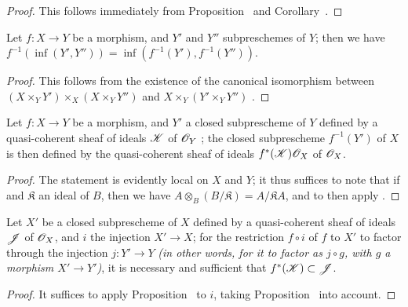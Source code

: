 \begin{proof}
\label{proof-1.4.4.3}
This follows immediately from Proposition~ and Corollary~.
\end{proof}

\begin{corollary}[4.4.4]
\label{I.4.4.4}
Let $f:X\to Y$ be a morphism, and $Y'$ and $Y''$ subpreschemes of $Y$;
then we have $f^{-1}(\inf(Y',Y''))=\inf(f^{-1}(Y'),f^{-1}(Y''))$.
\end{corollary}

\begin{proof}
\label{proof-1.4.4.4}
This follows from the existence of the canonical isomorphism between $(X\times_Y Y')\times_X(X\times_Y Y'')$ and $X\times_Y(Y'\times_Y Y'')$ .
\end{proof}

\begin{proposition}[4.4.5]
\label{I.4.4.5}
Let $f:X\to Y$ be a morphism, and $Y'$ a closed subprescheme of $Y$ defined by a quasi-coherent sheaf of ideals $\mathscr{K}$ of $\mathscr{O}_Y$ ;
the closed subprescheme $f^{-1}(Y')$ of $X$ is then defined by the quasi-coherent sheaf of ideals $f^*(\mathscr{K})\mathscr{O}_X$ of $\mathscr{O}_X$.
\end{proposition}

\begin{proof}
\label{proof-1.4.4.5}
The statement is evidently local on $X$ and $Y$;
it thus suffices to note that if  and $\mathfrak{K}$ an ideal of $B$, then we have $A\otimes_B(B/\mathfrak{K})=A/\mathfrak{K}A$, and to then apply .
\end{proof}

\begin{corollary}[4.4.6]
\label{I.4.4.6}
Let $X'$ be a closed subprescheme of $X$ defined by a quasi-coherent sheaf of ideals $\mathscr{J}$ of $\mathscr{O}_X$, and $i$ the injection $X'\to X$;
for the restriction $f\circ i$ of $f$ to $X'$ to factor through the injection $j:Y'\to Y$ \emph{(in other words, for it to factor as $j\circ g$, with $g$ a morphism $X'\to Y'$)}, it is necessary and sufficient that $f^*(\mathscr{K})\subset\mathscr{J}$.
\end{corollary}

\begin{proof}
\label{proof-1.4.4.6}
It suffices to apply Proposition~ to $i$, taking Proposition~ into account.
\end{proof}

